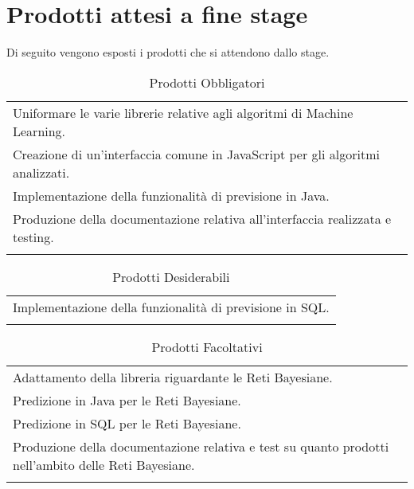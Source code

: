 \section{Prodotti attesi a fine stage}
 Di seguito vengono esposti i prodotti che si attendono dallo stage.
{\renewcommand{\arraystretch}{2}
\begin{longtable}{|p{13.25cm}|}
	\hline
	\rowcolor{blue} \multicolumn{1}{|c|}{
	\textbf{\textcolor{white}{Obbligatori}}
	} \\
		\endhead
		\hline \rowcolor{lightbrown}
		 Uniformare le varie librerie relative agli algoritmi di Machine Learning.\\	
		\hline \rowcolor{lighterbrown}
		 Creazione di un'interfaccia comune in JavaScript per gli algoritmi analizzati.\\	
		\hline \rowcolor{lightbrown}
		 Implementazione della funzionalità di previsione in Java. \\	
	\hline \rowcolor{lighterbrown}
		Produzione della documentazione relativa all'interfaccia realizzata e testing. \\	
	\hline
	\caption{Prodotti Obbligatori}\label{tab:obb-prod}
\end{longtable}}

{\renewcommand{\arraystretch}{2}
\begin{longtable}{|p{13.25cm}|}
	\hline
	\rowcolor{blue} \multicolumn{1}{|c|}{
	\textbf{\textcolor{white}{Desiderabili}}
	} \\
		\endhead
	\hline \rowcolor{lightbrown}
		 Implementazione della funzionalità di previsione in SQL. \\	
	\hline
	\caption{Prodotti Desiderabili}\label{tab:des-prod}
\end{longtable}}

{\renewcommand{\arraystretch}{2}
\begin{longtable}{|p{13.25cm}|}
	\hline
	\rowcolor{blue} \multicolumn{1}{|c|}{
	\textbf{\textcolor{white}{Facoltativi}}
	} \\
		\endhead
		\hline \rowcolor{lightbrown}
		 Adattamento della libreria riguardante le Reti Bayesiane.\\	
	\hline \rowcolor{lighterbrown}
		 Predizione in Java per le Reti Bayesiane.\\	
	\hline \rowcolor{lightbrown}
		 Predizione in SQL per le Reti Bayesiane.\\	
	\hline \rowcolor{lighterbrown}
		 Produzione della documentazione relativa e test su quanto prodotti nell'ambito delle Reti Bayesiane.\\	
	\hline
	\caption{Prodotti Facoltativi}\label{tab:fac-prod}
\end{longtable}}


